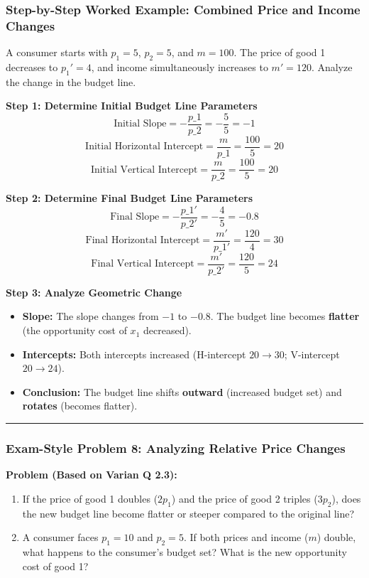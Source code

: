 \documentclass{article}
\begin{document}
\subsubsection*{Step-by-Step Worked Example: Combined Price and Income Changes}

A consumer starts with $p_1=5$, $p_2=5$, and $m=100$. The price of good 1 decreases to $p_1'=4$, and income simultaneously increases to $m'=120$. Analyze the change in the budget line.

\textbf{Step 1: Determine Initial Budget Line Parameters} \[ \text{Initial Slope} = -\frac{p\_1}{p\_2} = -\frac{5}{5} = -1 \] \[ \text{Initial Horizontal Intercept} = \frac{m}{p\_1} = \frac{100}{5} = 20 \] \[ \text{Initial Vertical Intercept} = \frac{m}{p\_2} = \frac{100}{5} = 20 \]

\textbf{Step 2: Determine Final Budget Line Parameters} \[ \text{Final Slope} = -\frac{p\_1'}{p\_2'} = -\frac{4}{5} = -0.8 \] \[ \text{Final Horizontal Intercept} = \frac{m'}{p\_1'} = \frac{120}{4} = 30 \] \[ \text{Final Vertical Intercept} = \frac{m'}{p\_2'} = \frac{120}{5} = 24 \]

\textbf{Step 3: Analyze Geometric Change}
\begin{itemize}
    \item \textbf{Slope:} The slope changes from $-1$ to $-0.8$. The budget line becomes \textbf{flatter} (the opportunity cost of $x_1$ decreased).
    \item \textbf{Intercepts:} Both intercepts increased (H-intercept $20 \to 30$; V-intercept $20 \to 24$).
    \item \textbf{Conclusion:} The budget line shifts \textbf{outward} (increased budget set) and \textbf{rotates} (becomes flatter).
\end{itemize}
\noindent\rule{\linewidth}{0.4pt}

\subsubsection*{Exam-Style Problem 8: Analyzing Relative Price Changes}

\textbf{Problem (Based on Varian Q 2.3):}
\begin{enumerate}
    \item If the price of good 1 doubles ($2p_1$) and the price of good 2 triples ($3p_2$), does the new budget line become flatter or steeper compared to the original line?
    \item A consumer faces $p_1=10$ and $p_2=5$. If both prices and income ($m$) double, what happens to the consumer's budget set? What is the new opportunity cost of good 1?
\end{enumerate}
\end{document}
